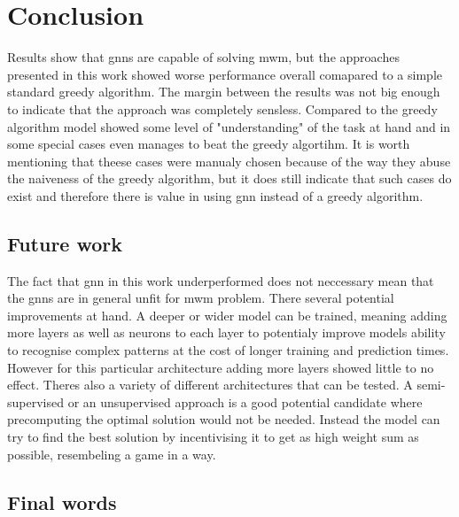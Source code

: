 \chapter{Conclusion}

Results show that \gls{gnn}s are capable of solving \gls{mwm}, but the approaches presented in this work showed worse performance overall comapared to a simple standard greedy algorithm. The margin between the results was not big enough to indicate that the approach was completely sensless. Compared to the greedy algorithm model showed some level of "understanding" of the task at hand and in some special cases even manages to beat the greedy algortihm. It is worth mentioning that theese cases were manualy chosen because of the way they abuse the naiveness of the greedy algorithm, but it does still indicate that such cases do exist and therefore there is value in using \gls{gnn} instead of a greedy algorithm. 

\section{Future work}

The fact that \gls{gnn} in this work underperformed does not neccessary mean that the \gls{gnn}s are in general unfit for \gls{mwm} problem. There several potential improvements at hand. A deeper or wider model can be trained, meaning adding more layers as well as neurons to each layer to potentialy improve models ability to recognise complex patterns at the cost of longer training and prediction times. However for this particular architecture adding more layers showed little to no effect. Theres also a variety of different architectures that can be tested. A semi-supervised or an unsupervised approach is a good potential candidate where precomputing the optimal solution would not be needed. Instead the model can try to find the best solution by incentivising it to get as high weight sum as possible, resembeling a game in a way.

\section{Final words}